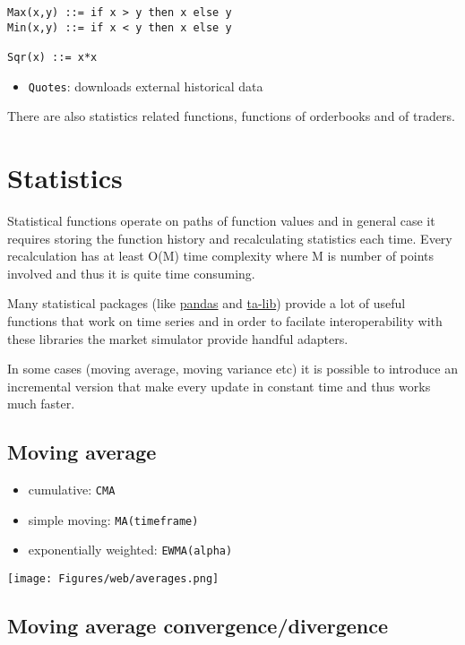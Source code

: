 \documentclass[a4paper,11pt]{article}
\begin{document}
\begin{verbatim}
Max(x,y) ::= if x > y then x else y
Min(x,y) ::= if x < y then x else y

Sqr(x) ::= x*x
\end{verbatim}

\begin{itemize}
\itemsep1pt\parskip0pt
\item
  \texttt{Quotes}: downloads external historical data
\end{itemize}

There are also statistics related functions,
functions of orderbooks and of traders.

\section{Statistics}\label{statistics}

Statistical functions operate on paths of function values and in general
case it requires storing the function history and recalculating
statistics each time. Every recalculation has at least O(M) time
complexity where M is number of points involved and thus it is quite
time consuming.

Many statistical packages (like \href{http://pandas.pydata.org/}{pandas}
and \href{http://ta-lib.org/}{ta-lib}) provide a lot of useful functions
that work on time series and in order to facilate interoperability with
these libraries the market simulator provide handful adapters.

In some cases (moving average, moving variance etc) it is possible to
introduce an incremental version that make every update in constant time
and thus works much faster.

\subsection{Moving average}\label{moving-average}

\begin{itemize}
\itemsep1pt\parskip0pt
\item
  cumulative: \texttt{CMA}
\item
  simple moving: \texttt{MA(timeframe)}
\item
  exponentially weighted: \texttt{EWMA(alpha)}
\end{itemize}

\centerline{\texttt{[image: Figures/web/averages.png]}}

\subsection{Moving average
convergence/divergence}\label{moving-average-convergencedivergence}
\end{document}
